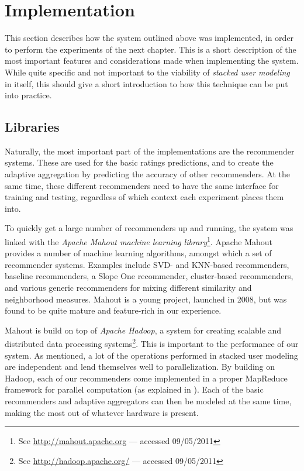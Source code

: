 
\chapter{Implementation}
\label{appendix:implementation}

This section describes how the system outlined above was implemented,
in order to perform the experiments of the next chapter.
This is a short description of the most important features and considerations
made when implementing the system.
While quite specific and not important to the viability of 
\emph{stacked user modeling} in itself,
this should give a short introduction to how this technique can be put into practice.

\section{Libraries}

Naturally, the most important part of the implementations are the recommender systems.
These are used for the basic ratings predictions, and to 
create the adaptive aggregation by predicting the accuracy of other recommenders.
At the same time, these different recommenders need to have the same
interface for training and testing, regardless of which context
each experiment places them into.

To quickly get a large number of recommenders up and running,
the system was linked with the \emph{Apache Mahout machine learning library}\footnote{
See \url{http://mahout.apache.org} --- accessed 09/05/2011}. 
Apache Mahout provides a number of machine learning
algorithms, amongst which a set of recommender systems.
Examples include SVD- and KNN-based recommenders,
baseline recommenders, a Slope One recommender,
cluster-based recommenders,
and various generic recommenders for mixing different 
similarity and neighborhood measures.
Mahout is a young project, launched in 2008, 
but was found to be quite mature and feature-rich
in our experience.

Mahout is build on top of \emph{Apache Hadoop},
a system for creating scalable and distributed data processing systems\footnote{
See \url{http://hadoop.apache.org/} --- accessed 09/05/2011}.
This is important to the performance of our system.
As mentioned, a lot of the operations performed in stacked user modeling
are independent and lend themselves well to parallelization.
By building on Hadoop, each of our recommenders come implemented in a 
proper MapReduce framework for parallel computation (as explained in \citet[p75]{Manning2008}).
Each of the basic recommenders and adaptive aggregators can then be modeled at the same time,
making the most out of whatever hardware is present.

